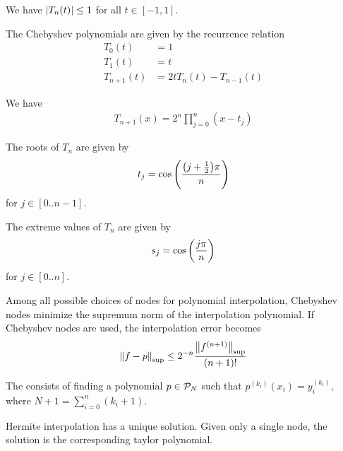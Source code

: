 \begin{lemma}
	We have $\abs{T_n(t)} \leq 1$ for all $t \in [-1,1]$.
\end{lemma}
\begin{lemma}
	The Chebyshev polynomials are given by the recurrence relation
	\begin{align*}
		T_0(t) &= 1\\
		T_1(t) &= t\\
		T_{n+1}(t) &= 2t T_n(t) - T_{n-1}(t)
	\end{align*}
\end{lemma}
\begin{corollary}
	We have
	\begin{align*}
		T_{n+1}(x) = 2^n \prod_{j = 0}^n (x - t_j)
	\end{align*}
\end{corollary}
\begin{lemma}
	The roots of $T_n$ are given by 
	\begin{align*}
		t_j = \cos\qty(\frac{\qty(j + \frac{1}{2})\pi}{n})
	\end{align*}
	for $j \in [0..n-1]$.
\end{lemma}
\begin{lemma}
	The extreme values of $T_n$ are given by
	\begin{align*}
		s_j = \cos\qty(\frac{j\pi}{n})
	\end{align*}
	for $j \in [0..n]$.
\end{lemma}
\begin{theorem}
	Among all possible choices of nodes for polynomial interpolation, Chebyshev nodes minimize the supremum norm of the interpolation polynomial. If Chebyshev nodes are used, the interpolation error becomes
	\begin{align*}
		\norm{f - p}_{\sup} \leq 2^{-n} \frac{\norm{f^{(n+1)}}_{\sup}}{(n+1)!}
	\end{align*}
\end{theorem}

\begin{definition}
	The  consists of finding a polynomial $p \in \mathcal{P}_N$ such that $p^{(k_i)}(x_i) = y^{(k_i)}_i$, where $N + 1 = \sum_{i = 0}^n (k_i + 1)$.
\end{definition}
\begin{proposition}
	Hermite interpolation has a unique solution. Given only a single node, the solution is the corresponding taylor polynomial.
\end{proposition}
